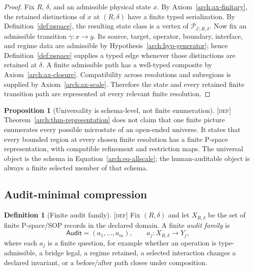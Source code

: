 \documentclass[11pt]{article}
\newcommand{\Pspace}{\ensuremath{\mathcal{P}}}
\newcommand{\Audit}{\ensuremath{\mathsf{Audit}}}
\newcommand{\Defn}{\textsc{[def]}}
\theoremstyle{definition}
\newtheorem{sdefinition}{Definition}
\newtheorem{sproposition}{Proposition}
\begin{document}
\begin{proof}
Fix $R$, $\delta$, and an admissible physical state $x$. By
Axiom~\ref{arch:ax-finitary}, the retained distinctions of $x$ at $(R,\delta)$
have a finite typed serialization. By Definition~\ref{def:pspace}, the resulting
state class is a vertex of $\Pspace_{\mathcal E;R,\delta}$. Now fix an admissible
transition $\gamma:x\to y$. Its source, target, operator, boundary, interface, and
regime data are admissible by Hypothesis~\ref{arch:hyp-generator}; hence
Definition~\ref{def:pspace} supplies a typed edge whenever those distinctions are
retained at $\delta$. A finite admissible path has a well-typed composite by
Axiom~\ref{arch:ax-closure}. Compatibility across resolutions and subregions is
supplied by Axiom~\ref{arch:ax-scale}. Therefore the state and every retained
finite transition path are represented at every relevant finite resolution.
\end{proof}

\begin{sproposition}[Universality is schema-level, not finite enumeration]
\label{arch:prop-universality}
\Defn{} Theorem~\ref{arch:thm-representation} does not claim that one finite
picture enumerates every possible microstate of an open-ended universe. It states
that every bounded region at every chosen finite resolution has a finite P-space
representation, with compatible refinement and restriction maps. The universal
object is the schema in Equation~\eqref{arch:eq-allscale}; the human-auditable
object is always a finite selected member of that schema.
\end{sproposition}

\subsection{Audit-minimal compression}

\begin{sdefinition}[Finite audit family]
\label{arch:def-audit-family}
\Defn{} Fix $(R,\delta)$ and let $X_{R,\delta}$ be the set of finite P-space/SOP
records in the declared domain. A finite \emph{audit family} is
\begin{equation}
\Audit=(a_1,\ldots,a_m),\qquad a_j:X_{R,\delta}\to Y_j,
\label{arch:eq-audit-family}
\end{equation}
where each $a_j$ is a finite question, for example whether an operation is
type-admissible, a bridge legal, a regime retained, a selected interaction changes
a declared invariant, or a before/after path closes under composition.
\end{sdefinition}
\end{document}
